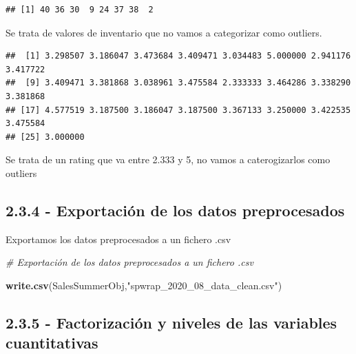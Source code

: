 \documentclass[
]{article}
\newenvironment{Shaded}{\begin{snugshade}}{\end{snugshade}}
\newcommand{\CommentTok}[1]{\textcolor[rgb]{0.56,0.35,0.01}{\textit{#1}}}
\newcommand{\KeywordTok}[1]{\textcolor[rgb]{0.13,0.29,0.53}{\textbf{#1}}}
\newcommand{\NormalTok}[1]{#1}
\newcommand{\OperatorTok}[1]{\textcolor[rgb]{0.81,0.36,0.00}{\textbf{#1}}}
\newcommand{\StringTok}[1]{\textcolor[rgb]{0.31,0.60,0.02}{#1}}
\begin{document}
\begin{verbatim}
## [1] 40 36 30  9 24 37 38  2
\end{verbatim}

Se trata de valores de inventario que no vamos a categorizar como
outliers.

\begin{Shaded}
\end{Shaded}

\begin{verbatim}
##  [1] 3.298507 3.186047 3.473684 3.409471 3.034483 5.000000 2.941176 3.417722
##  [9] 3.409471 3.381868 3.038961 3.475584 2.333333 3.464286 3.338290 3.381868
## [17] 4.577519 3.187500 3.186047 3.187500 3.367133 3.250000 3.422535 3.475584
## [25] 3.000000
\end{verbatim}

Se trata de un rating que va entre 2.333 y 5, no vamos a caterogizarlos
como outliers

\hypertarget{exportaciuxf3n-de-los-datos-preprocesados}{%
\subsection{2.3.4 - Exportación de los datos
preprocesados}\label{exportaciuxf3n-de-los-datos-preprocesados}}

Exportamos los datos preprocesados a un fichero .csv

\begin{Shaded}
\begin{Highlighting}[]
\CommentTok{# Exportación de los datos preprocesados a un fichero .csv}

\KeywordTok{write.csv}\NormalTok{(SalesSummerObj,}\StringTok{"spwrap_2020_08_data_clean.csv"}\NormalTok{)}
\end{Highlighting}
\end{Shaded}

\hypertarget{factorizaciuxf3n-y-niveles-de-las-variables-cuantitativas}{%
\subsection{2.3.5 - Factorización y niveles de las variables
cuantitativas}\label{factorizaciuxf3n-y-niveles-de-las-variables-cuantitativas}}
\end{document}
